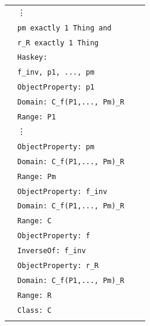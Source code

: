 \begin{longtable}{|>{\scriptsize}c|>{\scriptsize}l|>{\scriptsize}l|>{\scriptsize}p{0.8cm}|}
\begin{aligned}
  	&\texttt{\hspace*{6mm}} \vdots \\[\owlspacing]
  	&\texttt{\hspace*{4mm}pm exactly 1 Thing and}\\[\owlspacing]
  	&\texttt{\hspace*{4mm}r\_R exactly 1 Thing}\\[\owlspacing]
         &\texttt{\hspace*{2mm}Haskey:}\\[\owlspacing] 
         &\texttt{\hspace*{4mm}f\_inv, p1, ..., pm} \\  	
         &\texttt{ObjectProperty: p1}\\[\owlspacing]
         &\texttt{\hspace*{2mm}Domain: C\_f(P1,..., Pm)\_R}\\[\owlspacing]
         &\texttt{\hspace*{2mm}Range: P1}\\[\owlspacing]
         &\texttt{\hspace*{4mm}}\vdots \\[\owlspacing]
         &\texttt{ObjectProperty: pm}\\[\owlspacing]
         &\texttt{\hspace*{2mm}Domain: C\_f(P1,..., Pm)\_R}\\[\owlspacing]
         &\texttt{\hspace*{2mm}Range: Pm}\\
         &\texttt{ObjectProperty: f\_inv}\\[\owlspacing]
         &\texttt{\hspace*{2mm}Domain: C\_f(P1,..., Pm)\_R}\\[\owlspacing]
         &\texttt{\hspace*{2mm}Range: C}\\[\owlspacing]
         &\texttt{ObjectProperty: f}\\[\owlspacing]
         &\texttt{\hspace*{2mm}InverseOf: f\_inv}\\[\owlspacing]
         &\texttt{ObjectProperty: r\_R}\\[\owlspacing]
         &\texttt{\hspace*{2mm}Domain: C\_f(P1,..., Pm)\_R}\\[\owlspacing]
         &\texttt{\hspace*{2mm}Range: R}\\
         &\texttt{Class: C}\\[\owlspacing]

\end{aligned}
\end{longtable}
